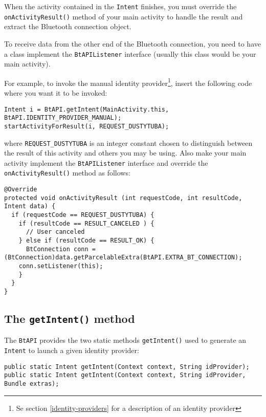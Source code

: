 \documentclass[a4paper,11pt]{article}
\begin{document}
When the activity contained in the \verb+Intent+ finishes, you must override the \verb+onActivityResult()+ method of your main activity to handle the result and extract the Bluetooth connection object.

To receive data from the other end of the Bluetooth connection, you need to have a class implement the \verb+BtAPIListener+ interface (usually this class would be your main activity).

For example, to invoke the manual identity provider\footnote{Se section \ref{identity-providers} for a description of an identity provider}, insert the following code where you want it to be invoked:

\footnotesize
\begin{verbatim}
Intent i = BtAPI.getIntent(MainActivity.this, BtAPI.IDENTITY_PROVIDER_MANUAL);
startActivityForResult(i, REQUEST_DUSTYTUBA);
\end{verbatim}
\normalsize

where \verb+REQUEST_DUSTYTUBA+ is an integer constant chosen to distinguish between the result of this activity and others you may be using. Also make your main activity implement the \verb+BtAPIListener+ interface and override the \verb+onActivityResult()+ method as follows:

\footnotesize
\begin{verbatim}
@Override
protected void onActivityResult (int requestCode, int resultCode, Intent data) {
  if (requestCode == REQUEST_DUSTYTUBA) {
    if (resultCode == RESULT_CANCELED ) {
      // User canceled
    } else if (resultCode == RESULT_OK) {
      BtConnection conn = (BtConnection)data.getParcelableExtra(BtAPI.EXTRA_BT_CONNECTION);
    conn.setListener(this);
    }
  }
}
\end{verbatim}
\normalsize

\subsection{The {\tt getIntent()} method}
\label{getIntent}
The \verb+BtAPI+ provides the two static methods \verb+getIntent()+ used to generate an \verb+Intent+ to launch a given identity provider:

\footnotesize
\begin{verbatim}
public static Intent getIntent(Context context, String idProvider);
public static Intent getIntent(Context context, String idProvider, Bundle extras);
\end{verbatim}
\normalsize
\end{document}
